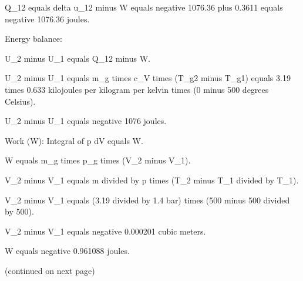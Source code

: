 Q_12 equals delta u_12 minus W equals negative 1076.36 plus 0.3611 equals negative 1076.36 joules.

Energy balance:  

U_2 minus U_1 equals Q_12 minus W.  

U_2 minus U_1 equals m_g times c_V times (T_g2 minus T_g1) equals 3.19 times 0.633 kilojoules per kilogram per kelvin times (0 minus 500 degrees Celsius).  

U_2 minus U_1 equals negative 1076 joules.  

Work (W):  
Integral of p dV equals W.  

W equals m_g times p_g times (V_2 minus V_1).  

V_2 minus V_1 equals m divided by p times (T_2 minus T_1 divided by T_1).  

V_2 minus V_1 equals (3.19 divided by 1.4 bar) times (500 minus 500 divided by 500).  

V_2 minus V_1 equals negative 0.000201 cubic meters.  

W equals negative 0.961088 joules.  

(continued on next page)
